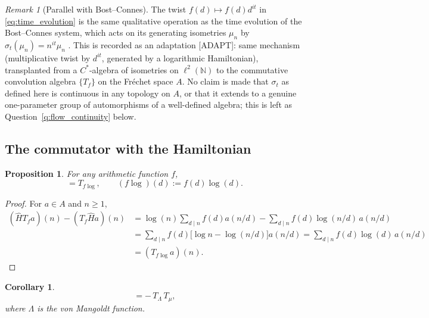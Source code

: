 \documentclass[11pt]{amsart}
\numberwithin{equation}{section}
\theoremstyle{plain}
\newtheorem{proposition}[theorem]{Proposition}
\newtheorem{corollary}[theorem]{Corollary}
\theoremstyle{definition}
\theoremstyle{remark}
\newtheorem{remark}[theorem]{Remark}
\newcommand{\N}{\mathbb{N}}
\begin{document}
\begin{remark}[Parallel with Bost--Connes]
\label{rem:bc_parallel}
The twist $f(d)\mapsto f(d)d^{it}$ in \eqref{eq:time_evolution} is the
same qualitative operation as the time evolution of the Bost--Connes
system, which acts on its generating isometries $\mu_n$ by
$\sigma_t(\mu_n)=n^{it}\mu_n$ \cite{BostConnes1995}. This is recorded
as an adaptation [ADAPT]: same mechanism (multiplicative twist by
$d^{it}$, generated by a logarithmic Hamiltonian), transplanted from a
$C^*$-algebra of isometries on $\ell^2(\N)$ to the commutative
convolution algebra $\{T_f\}$ on the Fr\'echet space $A$. No claim is
made that $\sigma_t$ as defined here is continuous in any topology on
$A$, or that it extends to a genuine one-parameter group of
automorphisms of a well-defined algebra; this is left as
Question~\ref{q:flow_continuity} below.
\end{remark}

\subsection{The commutator with the Hamiltonian}
\label{subsec:bc_flow_commutator}

\begin{proposition}
\label{prop:hamiltonian_commutator}
For any arithmetic function $f$,
\begin{equation}
[\hat H, T_f] = T_{f\log}, \qquad (f\log)(d) := f(d)\log(d).
\label{eq:hamiltonian_commutator}
\end{equation}
\end{proposition}

\begin{proof}
For $a\in A$ and $n\ge1$,
\begin{align}
(\hat H T_f a)(n) - (T_f\hat H a)(n)
&= \log(n)\sum_{d\mid n} f(d)a(n/d) - \sum_{d\mid n} f(d)\log(n/d)\,a(n/d)
\label{eq:ham_comm_step_one}\\
&= \sum_{d\mid n} f(d)\big[\log n - \log(n/d)\big]a(n/d)
= \sum_{d\mid n} f(d)\log(d)\,a(n/d)
\label{eq:ham_comm_step_two}\\
&= (T_{f\log}a)(n).
\label{eq:ham_comm_step_three}
\end{align}
\end{proof}

\begin{corollary}
\label{cor:hamiltonian_mobius_commutator}
\begin{equation}
[\hat H, T_\mu] = -\,T_\Lambda\, T_\mu,
\label{eq:hamiltonian_mobius_commutator}
\end{equation}
where $\Lambda$ is the von Mangoldt function.
\end{corollary}
\end{document}
